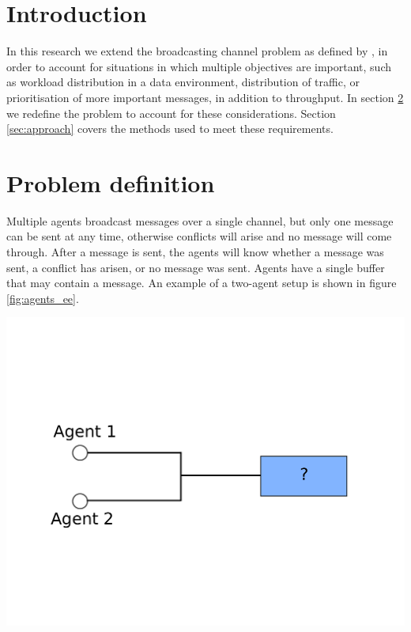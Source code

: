 \documentclass{article}
\makeatletter
\newenvironment{figurehere}
{\def\@captype{figure}}
{}
\makeatother
\begin{document}
	\begin{multicols}{2}

	\section{Introduction}
	\label{sec:introduction}
	In this research we extend the broadcasting channel problem as defined by
	\citet{ooi1996decentralized}, in order to account for situations in which
	multiple objectives are important, such as workload distribution in a data
	environment, distribution of traffic, or prioritisation of more important
	messages, in addition to throughput.
	In section \ref{sec:problem_definition} we redefine the problem to account
	for these considerations. Section \ref{sec:approach} covers the methods used
	to meet these requirements.

	\section{Problem definition}
	\label{sec:problem_definition}
	Multiple agents broadcast messages over a single channel, but only one
	message can be sent at any time, otherwise conflicts will arise and no
	message will come through. After a message is sent, the agents will know
	whether a message was sent, a conflict has arisen, or no message was sent.
	Agents have a single buffer that may contain a message. An example of a
	two-agent setup is shown in figure \ref{fig:agents_ee}.

	\begin{figurehere}
		\centering
		\includegraphics[scale=0.3]{images/agents_ee}
	   \label{fig:agents_ee}
	\end{figurehere}


\end{multicols}
\end{document}
